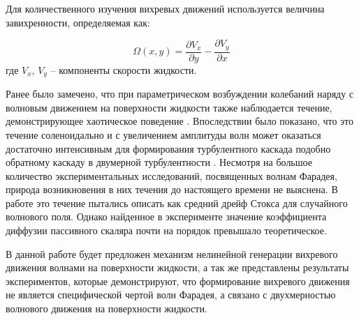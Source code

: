 Для количественного изучения вихревых движений используется величина завихренности, определяемая как:

\begin{equation}
 \label{eq:defVort}
\Omega(x, y) = \frac{\partial V_x}{\partial y} - \frac{\partial V_y}{\partial x}
\end{equation}
где $V_x$, $V_y$ – компоненты скорости жидкости. 

Ранее было замечено, что при параметрическом возбуждении колебаний наряду с волновым движением на поверхности жидкости также наблюдается течение, демонстрирующее хаотическое поведение \cite{Ramshankar1990}. Впоследствии было показано, что это течение соленоидально и с увеличением амплитуды волн может оказаться достаточно интенсивным для формирования турбулентного каскада \cite{VonKameke2011, Francois2014} подобно обратному каскаду в двумерной турбулентности \cite{Kraichnan1967}. Несмотря на большое количество экспериментальных исследований, посвященных волнам Фарадея, природа возникновения в них течения до настоящего времени не выяснена. В работе \cite{Mesquita1992} это течение пытались описать как средний дрейф Стокса \cite{Stokes1847} для случайного волнового поля. Однако найденное в эксперименте значение коэффициента диффузии пассивного скаляра почти на порядок превышало теоретическое.

В данной работе будет предложен механизм нелинейной генерации вихревого движения волнами на поверхности жидкости, а так же представлены результаты экспериментов, которые демонстрируют, что формирование вихревого движения не является специфической чертой волн Фарадея, а связано с двухмерностью волнового движения на поверхности жидкости.




